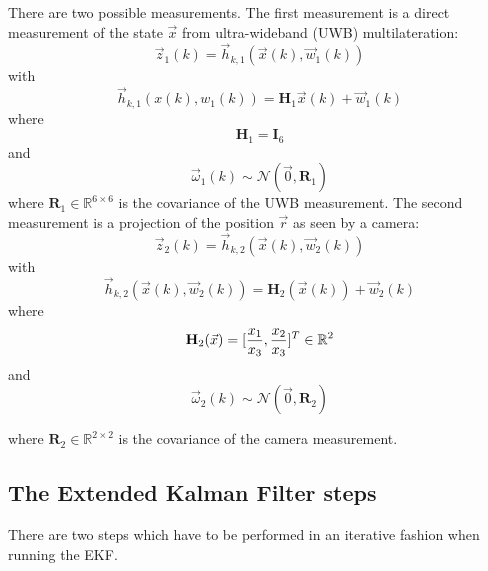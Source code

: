 There are two possible measurements. The first measurement is a direct measurement of the state $\vec x$ from ultra-wideband (\ac{UWB}) multilateration:
\begin{equation}
	\vec z_1(k) = \vec h_{k,1}(\vec x(k), \vec w_1(k))
\end{equation}
with
\begin{equation}
  \vec h_{k,1}(x(k), w_1(k)) = \textbf{H}_1 \vec x(k) + \vec w_1(k)
\end{equation}
where
$$\textbf{H}_1 = \textbf{I}_6$$
and
$$\vec \omega_1(k) \sim \mathcal{N}(\vec 0, \textbf{R}_1)$$
where $\textbf{R}_1 \in \mathbb{R}^{6\times6}$ is the covariance of the \ac{UWB} measurement.
The second measurement is a projection of the position $\vec r$ as seen by a camera:
\begin{equation}
	\vec z_2(k) = \vec h_{k,2}(\vec x(k), \vec w_2(k))
\end{equation}
with
\begin{equation}
  \vec h_{k,2}(\vec x(k), \vec w_2(k)) = \textbf{H}_2(\vec x(k)) + \vec w_2(k)
\end{equation}
where
\begin{equation}
	\textbf{H}_2(\vec x) = [\frac{x_1}{x_3}, \frac{x_2}{x_3}]^T \in \mathbb{R}^2\\
\end{equation}
and
\begin{equation}
  \vec \omega_2(k) \sim \mathcal{N}(\vec 0, \textbf{R}_2)
\end{equation}

where $\textbf{R}_2 \in \mathbb{R}^{2\times2}$ is the covariance of the camera measurement.

\subsection{The Extended Kalman Filter steps}
There are two steps which have to be performed in an iterative fashion when running the \ac{EKF}.

